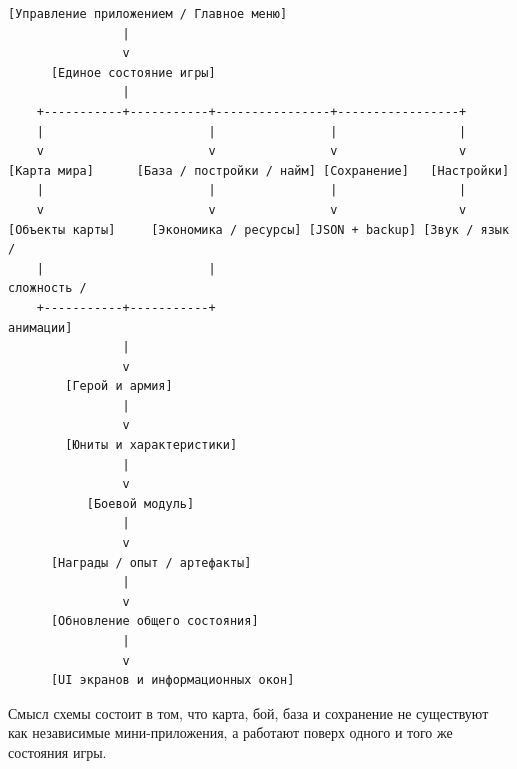 \documentclass[12pt,a4paper]{article}
\begin{document}
\begin{verbatim}
[Управление приложением / Главное меню]
                |
                v
      [Единое состояние игры]
                |
    +-----------+-----------+----------------+-----------------+
    |                       |                |                 |
    v                       v                v                 v
[Карта мира]      [База / постройки / найм] [Сохранение]   [Настройки]
    |                       |                |                 |
    v                       v                v                 v
[Объекты карты]     [Экономика / ресурсы] [JSON + backup] [Звук / язык /
    |                       |                                  сложность /
    +-----------+-----------+                                  анимации]
                |
                v
        [Герой и армия]
                |
                v
        [Юниты и характеристики]
                |
                v
           [Боевой модуль]
                |
                v
      [Награды / опыт / артефакты]
                |
                v
      [Обновление общего состояния]
                |
                v
      [UI экранов и информационных окон]
\end{verbatim}

Смысл схемы состоит в том, что карта, бой, база и сохранение не существуют как независимые мини-приложения, а работают поверх одного и того же состояния игры.
\end{document}
